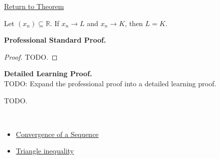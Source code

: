 \newpage
{}
\label{prf:uniqueness-of-limits}

\begin{remark*}[Return]
\hyperref[thm:uniqueness-of-limits]{Return to Theorem}
\end{remark*}

\begin{theorem*}
Let $(x_n) \subseteq \mathbb{R}$. If $x_n \to L$ and $x_n \to K$, then
$L=K$.
\end{theorem*}

\textbf{Professional Standard Proof.}~\\
\begin{proof}
TODO.
\end{proof}

\textbf{Detailed Learning Proof.}~\\
TODO: Expand the professional proof into a detailed learning proof.


\begin{remark*}
TODO.
\end{remark*}

\begin{remark*}[Dependencies]~\\
\begin{itemize}
  \item \hyperref[def:convergent-sequence]{Convergence of a Sequence}
  \item \hyperref[thm:triangle-inequality]{Triangle inequality}
\end{itemize}
\end{remark*}
